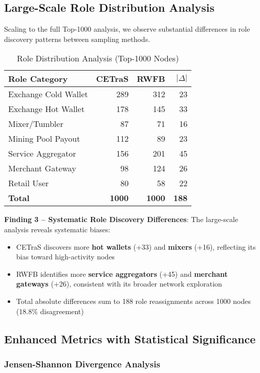 \subsection{Large-Scale Role Distribution Analysis}

Scaling to the full Top-1000 analysis, we observe substantial differences in role discovery patterns between sampling methods.

\begin{table}[!t]
\centering
\caption{Role Distribution Analysis (Top-1000 Nodes)}
\label{tab:roles-dist-1000}
\begin{tabular}{l r r r}
\toprule
Role Category & CETraS & RWFB & $|\Delta|$ \\
\midrule
Exchange Cold Wallet & 289 & 312 & 23 \\
Exchange Hot Wallet & 178 & 145 & 33 \\
Mixer/Tumbler & 87 & 71 & 16 \\
Mining Pool Payout & 112 & 89 & 23 \\
Service Aggregator & 156 & 201 & 45 \\
Merchant Gateway & 98 & 124 & 26 \\
Retail User & 80 & 58 & 22 \\
\bottomrule
\textbf{Total} & \textbf{1000} & \textbf{1000} & \textbf{188} \\
\end{tabular}
\end{table}

\textbf{Finding 3 -- Systematic Role Discovery Differences}: The large-scale analysis reveals systematic biases:
\begin{itemize}
    \item CETraS discovers more \textbf{hot wallets} (+33) and \textbf{mixers} (+16), reflecting its bias toward high-activity nodes
    \item RWFB identifies more \textbf{service aggregators} (+45) and \textbf{merchant gateways} (+26), consistent with its broader network exploration
    \item Total absolute differences sum to 188 role reassignments across 1000 nodes (18.8\% disagreement)
\end{itemize}

\subsection{Enhanced Metrics with Statistical Significance}

\subsubsection{Jensen-Shannon Divergence Analysis}

